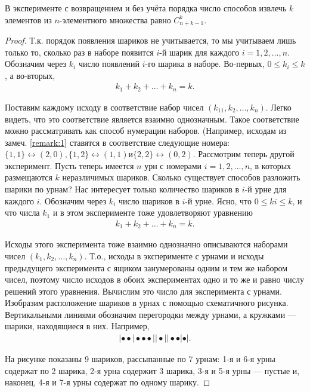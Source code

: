 \begin{theorem}
В эксперименте с возвращением и без учёта порядка число
способов извлечь $k$ элементов из $n$-элементного множества равно $C^k_{n+k-1}$.
\end{theorem}
\begin{proof}
Т.к. порядок появления шариков не учитывается, то мы
учитываем лишь только то, сколько раз в наборе появится $i$-й шарик для
каждого $i = 1, 2,\dots, n$. Обозначим через $k_i$ число появлений $i$-го шарика в
наборе. Во-первых, $0 \leqslant k_i \leqslant k$, а во-вторых,
\begin{gather*}
k_1+k_2+\dots+k_n=k.
\end{gather*}

Поставим каждому исходу в соответствие набор чисел $(k_11, k_2,\dots, k_n)$.
Легко видеть, что это соответствие является взаимно однозначным. Такое соответствие можно рассматривать как способ нумерации наборов. (Например,
исходам из замеч. \ref{remark:1} ставятся в соответствие следующие номера:
$\{1, 1\} \leftrightarrow (2, 0), 
\{1, 2\} \leftrightarrow (1, 1) и 
\{2, 2\} \leftrightarrow (0, 2).$
Рассмотрим теперь другой эксперимент. Пусть теперь имеется $n$ урн с
номерами $i = 1, 2,\dots, n$, в которых размещаются $k$ неразличимых шариков.
Сколько существует способов разложить шарики по урнам? Нас интересует
только количество шариков в $i$-й урне для каждого $i$. Обозначим через $k_i$
число шариков в $i$-й урне. Ясно, что $0 \leqslant ki \leqslant k$, и что числа $k_1$ и в этом
эксперименте тоже удовлетворяют уравнению
\begin{gather*}
k_1+k_2+\dots+k_n=k.
\end{gather*}

Исходы этого эксперимента тоже взаимно однозначно описываются наборами
чисел \newline $(k_1, k_2,\dots, k_n)$. Т.о., исходы в эксперименте с урнами и исходы предыдущего эксперимента с ящиком занумерованы одним и тем же набором чисел,
поэтому число исходов в обоих экспериментах одно и то же и равно числу
решений этого уравнения. Вычислим это число для эксперимента с урнами.
Изобразим расположение шариков в урнах с помощью схематичного рисунка. Вертикальными линиями обозначим перегородки между урнами, а
кружками — шарики, находящиеся в них. Например,
\begin{gather*}
\left|\bullet\bullet\right|\bullet\bullet\bullet||\bullet||\bullet\bullet|\bullet|.
\end{gather*}

На рисунке показаны 9 шариков, рассыпанные по 7 урнам: 1-я и 6-я урны
содержат по 2 шарика, 2-я урна содержит 3 шарика, 3-я и 5-я урны — пустые
и, наконец, 4-я и 7-я урны содержат по одному шарику.


\end{proof}
